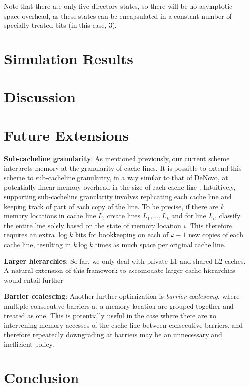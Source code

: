 \documentclass{article}
\begin{document}
Note that there are only five directory states, so there will be no asymptotic space overhead, as these states can be encapsulated in a constant number of specially treated bits (in this case, 3). 


\section{Simulation Results}

\section{Discussion}

\section{Future Extensions}
\textbf{Sub-cacheline granularity}: As mentioned previously, our current scheme interprets memory at the granularity of cache lines. It is possible to extend this scheme to sub-cacheline granularity, in a way similar to that of DeNovo, at potentially linear memory overhead in the size of each cache line \cite{choi2010denovo}. Intuitively, supporting sub-cacheline granularity involves replicating each cache line and keeping track of part of each copy of the line. To be precise, if there are $k$ memory locations in cache line $L$, create lines $L_1, \dots, L_k$ and for line $L_i$, classify the entire line solely based on the state of memory location $i$. This therefore requires an extra $\log k$ bits for bookkeeping on each of $k-1$ new copies of each cache line, resulting in $k \log k$ times as much space per original cache line.

\textbf{Larger hierarchies}: So far, we only deal with private L1 and shared L2 caches. A natural extension of this framework to accomodate larger cache hierarchies would entail further 

\textbf{Barrier coalescing}: Another further optimization is \textit{barrier coalescing}, where multiple consecutive barriers at a memory location are grouped together and treated as one. This is potentially useful in the case where there are no intervening memory accesses of the cache line between consecutive barriers, and therefore repeatedly downgrading at barriers may be an unnecessary and inefficient policy.

\section{Conclusion}

\printbibliography
\end{document}
